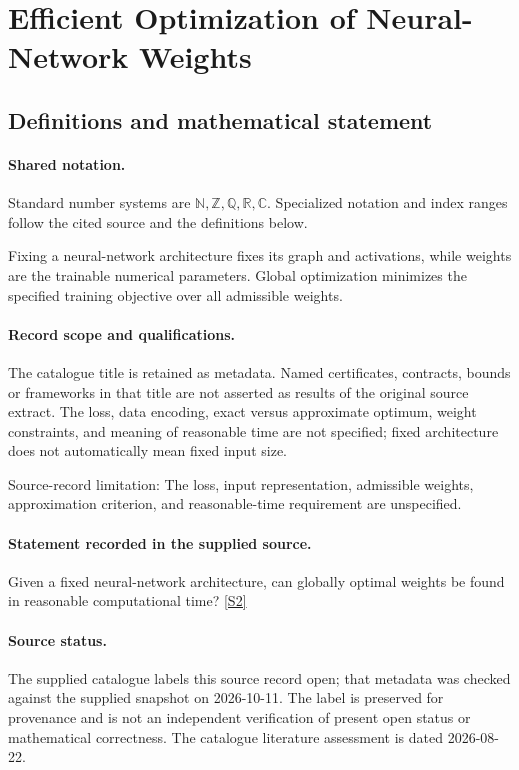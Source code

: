\documentclass[11pt]{article}
\newcommand{\sref}[2]{\hyperlink{source:#1:#2}{[S#2]}}
\begin{document}
\section{Efficient Optimization of Neural-Network Weights}\label{statement}

\subsection{Definitions and mathematical statement}

\paragraph{Shared notation.}Standard number systems are $\mathbb N,\mathbb Z,\mathbb Q,\mathbb R,\mathbb C$. Specialized notation and index ranges follow the cited source and the definitions below.


Fixing a neural-network architecture fixes its graph and activations, while weights are the trainable numerical parameters. Global optimization minimizes the specified training objective over all admissible weights.
\paragraph{Record scope and qualifications.}
The catalogue title is retained as metadata. Named certificates, contracts, bounds or frameworks in that title are not asserted as results of the original source extract.
The loss, data encoding, exact versus approximate optimum, weight constraints, and meaning of reasonable time are not specified; fixed architecture does not automatically mean fixed input size.

Source-record limitation: The loss, input representation, admissible weights, approximation criterion, and reasonable-time requirement are unspecified.
\paragraph{Statement recorded in the supplied source.}
Given a fixed neural-network architecture, can globally optimal weights be found in reasonable computational time? \sref{statement}{2}
\paragraph{Source status.}
The supplied catalogue labels this source record open; that metadata was checked against the supplied snapshot on 2026-10-11. The label is preserved for provenance and is not an independent verification of present open status or mathematical correctness. The catalogue literature assessment is dated 2026-08-22.
\end{document}
